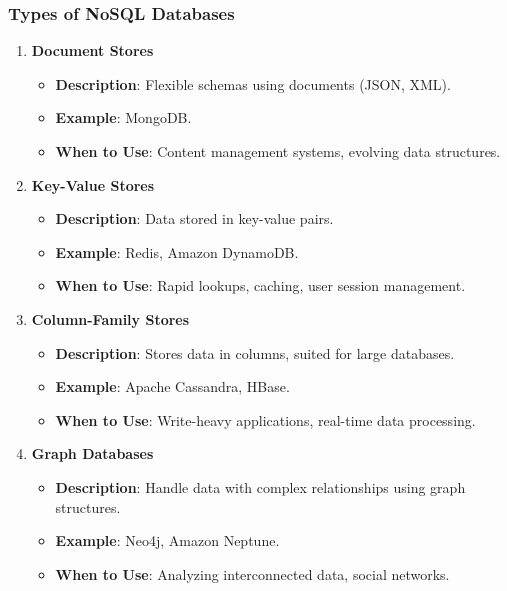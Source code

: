 \documentclass[aspectratio=169]{beamer}
\begin{document}
\begin{frame}[fragile]
    \frametitle{Types of NoSQL Databases}
    \begin{enumerate}
        \item \textbf{Document Stores}
            \begin{itemize}
                \item \textbf{Description}: Flexible schemas using documents (JSON, XML).
                \item \textbf{Example}: MongoDB.
                \item \textbf{When to Use}: Content management systems, evolving data structures.
            \end{itemize}
        
        \item \textbf{Key-Value Stores}
            \begin{itemize}
                \item \textbf{Description}: Data stored in key-value pairs.
                \item \textbf{Example}: Redis, Amazon DynamoDB.
                \item \textbf{When to Use}: Rapid lookups, caching, user session management.
            \end{itemize}

        \item \textbf{Column-Family Stores}
            \begin{itemize}
                \item \textbf{Description}: Stores data in columns, suited for large databases.
                \item \textbf{Example}: Apache Cassandra, HBase.
                \item \textbf{When to Use}: Write-heavy applications, real-time data processing.
            \end{itemize}

        \item \textbf{Graph Databases}
            \begin{itemize}
                \item \textbf{Description}: Handle data with complex relationships using graph structures.
                \item \textbf{Example}: Neo4j, Amazon Neptune.
                \item \textbf{When to Use}: Analyzing interconnected data, social networks.
            \end{itemize}
    \end{enumerate}
\end{frame}
\end{document}
